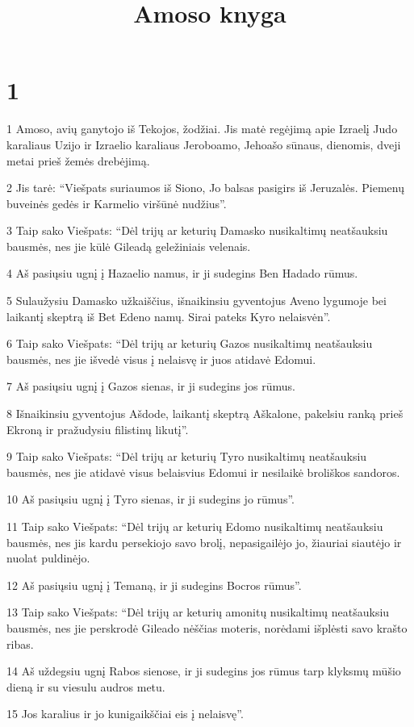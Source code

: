 

\title{Amoso knyga}

\chapter{1}


\par 1 Amoso, avių ganytojo iš Tekojos, žodžiai. Jis matė regėjimą apie Izraelį Judo karaliaus Uzijo ir Izraelio karaliaus Jeroboamo, Jehoašo sūnaus, dienomis, dveji metai prieš žemės drebėjimą. 
\par 2 Jis tarė: “Viešpats suriaumos iš Siono, Jo balsas pasigirs iš Jeruzalės. Piemenų buveinės gedės ir Karmelio viršūnė nudžius”. 
\par 3 Taip sako Viešpats: “Dėl trijų ar keturių Damasko nusikaltimų neatšauksiu bausmės, nes jie kūlė Gileadą geležiniais velenais. 
\par 4 Aš pasiųsiu ugnį į Hazaelio namus, ir ji sudegins Ben Hadado rūmus. 
\par 5 Sulaužysiu Damasko užkaiščius, išnaikinsiu gyventojus Aveno lygumoje bei laikantį skeptrą iš Bet Edeno namų. Sirai pateks Kyro nelaisvėn”. 
\par 6 Taip sako Viešpats: “Dėl trijų ar keturių Gazos nusikaltimų neatšauksiu bausmės, nes jie išvedė visus į nelaisvę ir juos atidavė Edomui. 
\par 7 Aš pasiųsiu ugnį į Gazos sienas, ir ji sudegins jos rūmus. 
\par 8 Išnaikinsiu gyventojus Ašdode, laikantį skeptrą Aškalone, pakelsiu ranką prieš Ekroną ir pražudysiu filistinų likutį”. 
\par 9 Taip sako Viešpats: “Dėl trijų ar keturių Tyro nusikaltimų neatšauksiu bausmės, nes jie atidavė visus belaisvius Edomui ir nesilaikė broliškos sandoros. 
\par 10 Aš pasiųsiu ugnį į Tyro sienas, ir ji sudegins jo rūmus”. 
\par 11 Taip sako Viešpats: “Dėl trijų ar keturių Edomo nusikaltimų neatšauksiu bausmės, nes jis kardu persekiojo savo brolį, nepasigailėjo jo, žiauriai siautėjo ir nuolat puldinėjo. 
\par 12 Aš pasiųsiu ugnį į Temaną, ir ji sudegins Bocros rūmus”. 
\par 13 Taip sako Viešpats: “Dėl trijų ar keturių amonitų nusikaltimų neatšauksiu bausmės, nes jie perskrodė Gileado nėščias moteris, norėdami išplėsti savo krašto ribas. 
\par 14 Aš uždegsiu ugnį Rabos sienose, ir ji sudegins jos rūmus tarp klyksmų mūšio dieną ir su viesulu audros metu. 
\par 15 Jos karalius ir jo kunigaikščiai eis į nelaisvę”.


